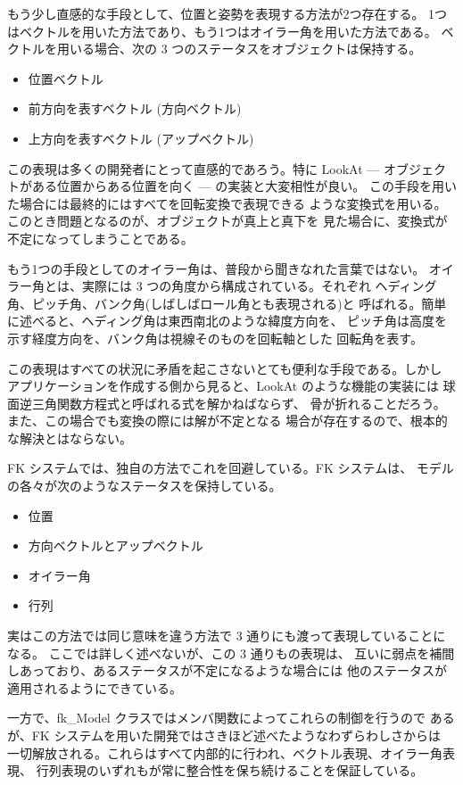 もう少し直感的な手段として、位置と姿勢を表現する方法が2つ存在する。
1つはベクトルを用いた方法であり、もう1つはオイラー角を用いた方法である。
ベクトルを用いる場合、次の 3 つのステータスをオブジェクトは保持する。
\begin{itemize}
 \item 位置ベクトル
 \item 前方向を表すベクトル (方向ベクトル)
 \item 上方向を表すベクトル (アップベクトル)
\end{itemize}
この表現は多くの開発者にとって直感的であろう。特に LookAt ---
オブジェクトがある位置からある位置を向く --- の実装と大変相性が良い。
この手段を用いた場合には最終的にはすべてを回転変換で表現できる
ような変換式を用いる。このとき問題となるのが、オブジェクトが真上と真下を
見た場合に、変換式が不定になってしまうことである。

もう1つの手段としてのオイラー角は、普段から聞きなれた言葉ではない。
オイラー角とは、実際には 3 つの角度から構成されている。それぞれ
ヘディング角、ピッチ角、バンク角(しばしばロール角とも表現される)と
呼ばれる。簡単に述べると、ヘディング角は東西南北のような緯度方向を、
ピッチ角は高度を示す経度方向を、バンク角は視線そのものを回転軸とした
回転角を表す。

この表現はすべての状況に矛盾を起こさないとても便利な手段である。しかし
アプリケーションを作成する側から見ると、LookAt のような機能の実装には
球面逆三角関数方程式と呼ばれる式を解かねばならず、
骨が折れることだろう。また、この場合でも変換の際には解が不定となる
場合が存在するので、根本的な解決とはならない。

FK システムでは、独自の方法でこれを回避している。FK システムは、
モデルの各々が次のようなステータスを保持している。
\begin{itemize}
 \item 位置
 \item 方向ベクトルとアップベクトル
 \item オイラー角
 \item 行列
\end{itemize}
実はこの方法では同じ意味を違う方法で 3 通りにも渡って表現していることになる。
ここでは詳しく述べないが、この 3 通りもの表現は、
互いに弱点を補間しあっており、あるステータスが不定になるような場合には
他のステータスが適用されるようにできている。

一方で、fk\_Model クラスではメンバ関数によってこれらの制御を行うので
あるが、FK システムを用いた開発ではさきほど述べたようなわずらわしさからは
一切解放される。これらはすべて内部的に行われ、ベクトル表現、オイラー角表現、
行列表現のいずれもが常に整合性を保ち続けることを保証している。

